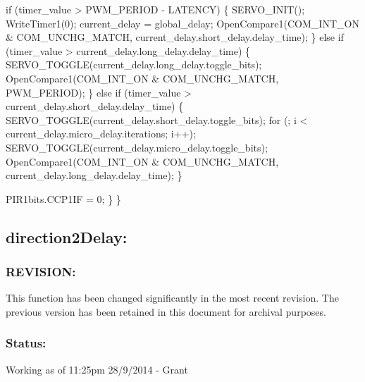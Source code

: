 \documentclass[]{report}
\begin{document}
		if (timer\_value > PWM\_PERIOD - LATENCY)\newline
		\{\newline
			SERVO\_INIT();\newline
			WriteTimer1(0);\newline
			current\_delay = global\_delay;\newline
			OpenCompare1(COM\_INT\_ON \& COM\_UNCHG\_MATCH, current\_delay.short\_delay.delay\_time);\newline
		\}\newline
		else if (timer\_value > current\_delay.long\_delay.delay\_time)\newline
		\{\newline
			SERVO\_TOGGLE(current\_delay.long\_delay.toggle\_bits);\newline
			OpenCompare1(COM\_INT\_ON \& COM\_UNCHG\_MATCH, PWM\_PERIOD); \newline
		\}\newline
		else if (timer\_value > current\_delay.short\_delay.delay\_time)\newline
		\{\newline
			SERVO\_TOGGLE(current\_delay.short\_delay.toggle\_bits);\newline
			for (; i < current\_delay.micro\_delay.iterations; i++);\newline
			SERVO\_TOGGLE(current\_delay.micro\_delay.toggle\_bits);\newline
			OpenCompare1(COM\_INT\_ON \& COM\_UNCHG\_MATCH, current\_delay.long\_delay.delay\_time);\newline
		\}\newline
		
		PIR1bits.CCP1IF = 0;\newline
	\}\newline
\}\newline

\subsection{direction2Delay:}
\subsubsection{REVISION:}
This function has been changed significantly in the most recent revision. The previous version has been retained in this document for archival purposes.

\subsubsection{Status:}
Working as of 11:25pm 28/9/2014 - Grant
\end{document}

